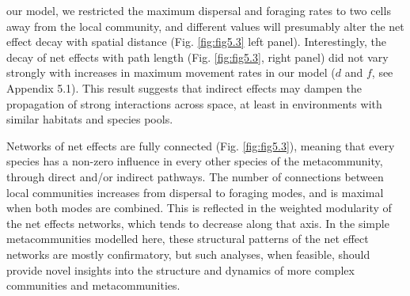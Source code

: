 our model, we restricted the maximum dispersal and foraging rates to two cells away from the local community, and different values will presumably alter the net effect decay with spatial distance (Fig.  \ref{fig:fig5.3} left panel). Interestingly, the decay of net effects with path length (Fig.  \ref{fig:fig5.3}, right panel) did not vary strongly with increases in maximum movement rates in our model ($d$ and $f$, see Appendix 5.1). This result suggests that indirect effects may dampen the propagation of strong interactions across space, at least in environments with similar habitats and species pools.

Networks of net effects are fully connected (Fig. \ref{fig:fig5.3}), meaning that every species has a non-zero influence in every other species of the metacommunity, through direct and/or indirect pathways. The number of connections between local communities increases from dispersal to foraging modes, and is maximal when both modes are combined. This is reflected in the weighted modularity of the net effects networks, which tends to decrease along that axis. In the simple metacommunities modelled here, these structural patterns of the net effect networks are mostly confirmatory, but such analyses, when feasible, should provide novel insights into the structure and dynamics of more complex communities and metacommunities.

